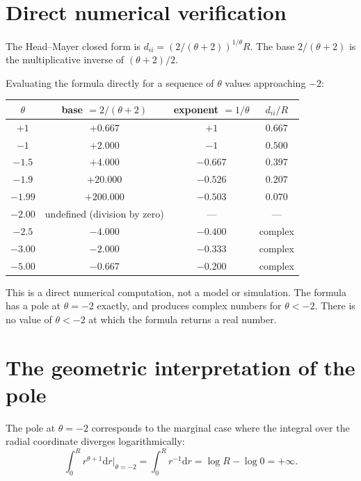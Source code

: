 \documentclass[11pt,letterpaper,oneside]{book}
\theoremstyle{definition}
\theoremstyle{remark}
\newcommand{\diff}{\mathrm{d}}
\begin{document}
\section{Direct numerical verification}

The Head--Mayer closed form is $d_{ii} = (2/(\theta+2))^{1/\theta} R$. The base $2/(\theta+2)$ is the multiplicative inverse of $(\theta+2)/2$.

Evaluating the formula directly for a sequence of $\theta$ values approaching $-2$:

\begin{center}
\small
\begin{tabular}{cccc}
\toprule
$\theta$ & base $= 2/(\theta+2)$ & exponent $= 1/\theta$ & $d_{ii}/R$ \\
\midrule
$+1$ & $+0.667$ & $+1$ & $0.667$ \\
$-1$ & $+2.000$ & $-1$ & $0.500$ \\
$-1.5$ & $+4.000$ & $-0.667$ & $0.397$ \\
$-1.9$ & $+20.000$ & $-0.526$ & $0.207$ \\
$-1.99$ & $+200.000$ & $-0.503$ & $0.070$ \\
$-2.00$ & undefined (division by zero) & --- & --- \\
$-2.5$ & $-4.000$ & $-0.400$ & complex \\
$-3.00$ & $-2.000$ & $-0.333$ & complex \\
$-5.00$ & $-0.667$ & $-0.200$ & complex \\
\bottomrule
\end{tabular}
\end{center}

This is a direct numerical computation, not a model or simulation. The formula has a pole at $\theta = -2$ exactly, and produces complex numbers for $\theta < -2$. There is no value of $\theta < -2$ at which the formula returns a real number.

\section{The geometric interpretation of the pole}

The pole at $\theta = -2$ corresponds to the marginal case where the integral over the radial coordinate diverges logarithmically:
\begin{equation}
\int_0^R r^{\theta+1} \diff r \Big|_{\theta = -2} = \int_0^R r^{-1} \diff r = \log R - \log 0 = +\infty.
\end{equation}
\end{document}
